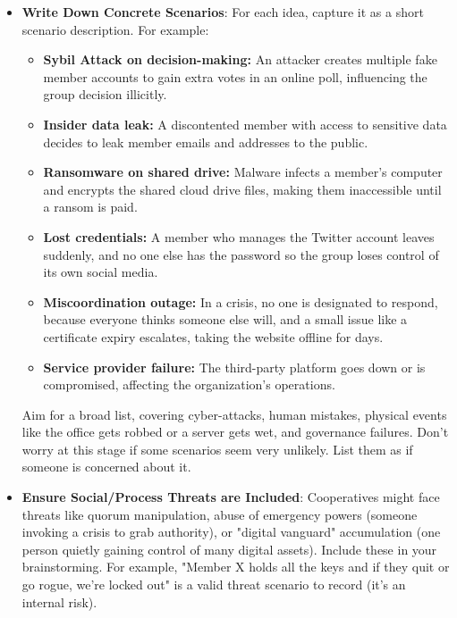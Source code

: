 \begin{itemize}
    \item \textbf{Write Down Concrete Scenarios}:
    For each idea, capture it as a short scenario description.
    For example:

    \begin{itemize}
        \item \textbf{Sybil Attack on decision-making:} An attacker creates multiple fake member
        accounts to gain extra votes in an online poll, influencing the group decision illicitly.
        \item \textbf{Insider data leak:} A discontented member with access to sensitive data decides
        to leak member emails and addresses to the public.
        \item \textbf{Ransomware on shared drive:} Malware infects a member's computer and encrypts the
        shared cloud drive files, making them inaccessible until a ransom is paid.
        \item \textbf{Lost credentials:} A member who manages the Twitter account leaves suddenly, and
        no one else has the password so the group loses control of its own social media.
        \item \textbf{Miscoordination outage:} In a crisis, no one is designated to respond, because everyone
        thinks someone else will, and a small issue like a certificate expiry escalates, taking the website
        offline for days.
        \item \textbf{Service provider failure:} The third-party platform goes
        down or is compromised, affecting the organization's operations.
    \end{itemize}

    Aim for a broad list, covering cyber-attacks, human mistakes, physical events
    like the office gets robbed or a server gets wet, and governance failures. Don't
    worry at this stage if some scenarios seem very unlikely. List them as if someone
    is concerned about it.

    \item \textbf{Ensure Social/Process Threats are Included}:
    Cooperatives might face threats like quorum manipulation, abuse of emergency powers
    (someone invoking a crisis to grab authority), or "digital vanguard" accumulation (one person
    quietly gaining control of many digital assets). Include these in
    your brainstorming. For example, "Member X holds all the keys and if they quit
    or go rogue, we're locked out" is a valid threat scenario to record (it's an
    internal risk).

\end{itemize}

